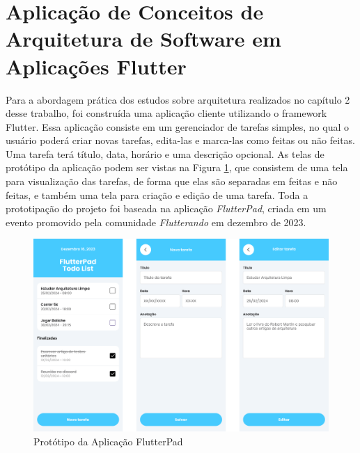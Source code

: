 \documentclass[12pt, %
openright, 
oneside, %
a4paper,    %
brazil]{facom-ufu-abntex2}
\begin{document}
\section{Aplicação de Conceitos de Arquitetura de Software em Aplicações Flutter} \label{sec:arch}

Para a abordagem prática dos estudos sobre arquitetura realizados no capítulo 2 desse trabalho, foi construída uma aplicação cliente utilizando o framework Flutter. Essa aplicação consiste em um gerenciador de tarefas simples, no qual o usuário poderá criar novas tarefas, edita-las e marca-las como feitas ou não feitas. Uma tarefa terá título, data, horário e uma descrição opcional. As telas de protótipo da aplicação podem ser vistas na Figura \ref{fig:flutterpad_figma}, que consistem de uma tela para visualização das tarefas, de forma que elas são separadas em feitas e não feitas, e também uma tela para criação e edição de uma tarefa. Toda a prototipação do projeto foi baseada na aplicação \textit{FlutterPad}, criada em um evento promovido pela comunidade \textit{Flutterando} em dezembro de 2023.

\begin{figure}[ht]
    \centering
    \includegraphics[width=.85\textwidth]{figures/arch/flutterpad_figma.png}
    \caption{Protótipo da Aplicação FlutterPad}
    \label{fig:flutterpad_figma}
\end{figure}
\end{document}
